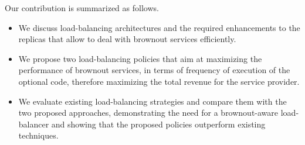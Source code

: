 Our contribution is summarized as follows.
\begin{itemize}
\item We discuss load-balancing architectures and the required
  enhancements to the replicas that allow to deal with
  brownout services efficiently.
\item We propose two load-balancing policies that aim at maximizing
  the performance of brownout services, in terms
  of frequency of execution of the optional code, therefore
  maximizing the total revenue for the service provider.
\item We evaluate existing load-balancing strategies and compare them
  with the two proposed approaches, demonstrating the need for a
  brownout-aware load-balancer and showing that the proposed policies
  outperform existing techniques.
\end{itemize}
